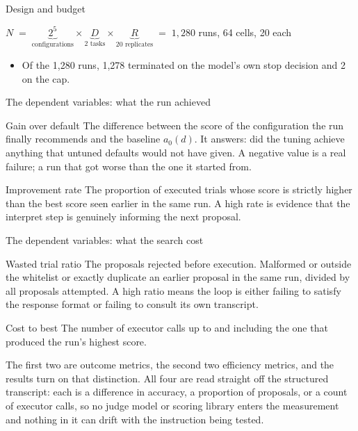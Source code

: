 \documentclass[aspectratio=169,11pt]{beamer}
\newcommand{\fnote}[1]{{\scriptsize\color{muted}#1}}
\begin{document}
\begin{frame}{Design and budget}
  \begin{block}{}
    \centering
    $N \;=\; \underbrace{2^5}_{\text{configurations}} \times
             \underbrace{D}_{\text{2 tasks}} \times
             \underbrace{R}_{\text{20 replicates}} \;=\; 1{,}280$ runs,
             64 cells, 20 each
  \end{block}
  \vfill
  \begin{itemize}
    \item Of the 1{,}280 runs, 1{,}278 terminated on the model's own stop
          decision and 2 on the  cap.
  \end{itemize}
\end{frame}

\begin{frame}{The dependent variables: what the run achieved}
  \begin{block}{Gain over default}
    \small
    The difference between the score of the configuration the run finally
    recommends and the baseline $a_0(d)$. It answers: did the tuning achieve anything that untuned
    defaults would not have given. A negative value is a real failure; a run that got worse than the one it started from.
  \end{block}
  \vfill
  \begin{block}{Improvement rate}
    \small
    The proportion of executed trials whose score is strictly higher than the
    best score seen earlier in the same run. A high
    rate is evidence that the interpret step is genuinely informing the next
    proposal.
  \end{block}
\end{frame}

\begin{frame}{The dependent variables: what the search cost}
  \begin{block}{Wasted trial ratio}
    \small
    The proposals rejected before execution. Malformed or outside the
    whitelist or exactly duplicate an earlier proposal in
    the same run, divided by all proposals attempted. A high ratio means the loop is either
    failing to satisfy the response format or failing to consult its own
    transcript.
  \end{block}
  \vfill
  \begin{block}{Cost to best}
    \small
    The number of executor calls up to and including the one that produced the
    run's highest score. 
  \end{block}
  \vfill
  \fnote{The first two are outcome metrics, the second two efficiency metrics,
        and the results turn on that distinction. All four are read straight off
        the structured transcript: each is a difference in accuracy, a
        proportion of proposals, or a count of executor calls, so no judge model
        or scoring library enters the measurement and nothing in it can drift
        with the instruction being tested.}
\end{frame}
\end{document}
